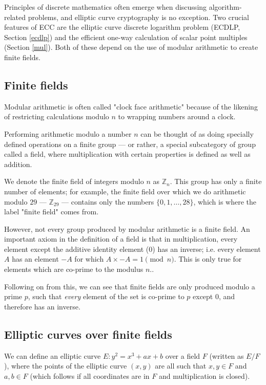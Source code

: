 \documentclass[a4paper]{article}
\begin{document}
Principles of discrete mathematics often emerge when discussing algorithm-related problems, and elliptic curve cryptography is no exception. Two crucial features of ECC are the elliptic curve discrete logarithm problem (ECDLP, Section \ref{ecdlp}) and the efficient one-way calculation of scalar point multiples (Section \ref{mul}). Both of these depend on the use of modular arithmetic to create finite fields.

\subsection{Finite fields}

Modular arithmetic is often called "clock face arithmetic" because of the likening of restricting calculations modulo $n$ to wrapping numbers around a clock.


Performing arithmetic modulo a number $n$ can be thought of as doing specially defined operations on a finite group --- or rather, a special subcategory of group called a field, where multiplication with certain properties is defined as well as addition.

We denote the finite field of integers modulo $n$ as $\mathbb{Z}_n$. This group has only a finite number of elements; for example, the finite field over which we do arithmetic modulo $29$ --- $\mathbb{Z}_{29}$ --- contains only the numbers $\{0, 1, \dots, 28\}$, which is where the label "finite field" comes from.

However, not every group produced by modular arithmetic is a finite field. An important axiom in the definition of a field is that in multiplication, every element except the additive identity element ($0$) has an inverse; i.e. every element $A$ has an element $-A$ for which $A \times -A = 1 \pmod{n}$. This is only true for elements which are co-prime to the modulus $n$.\cite{discrete}.

Following on from this, we can see that finite fields are only produced modulo a prime $p$, such that \textit{every} element of the set is co-prime to $p$ except $0$, and therefore has an inverse.\cite{discrete}

\subsection{Elliptic curves over finite fields}

We can define an elliptic curve $E: y^2 = x^3 + ax + b$ over a field $F$ (written as $E/F$), where the points of the elliptic curve $(x, y)$ are all such that $x, y \in F$ and $a, b \in F$ (which follows if all coordinates are in $F$ and multiplication is closed).
\end{document}
